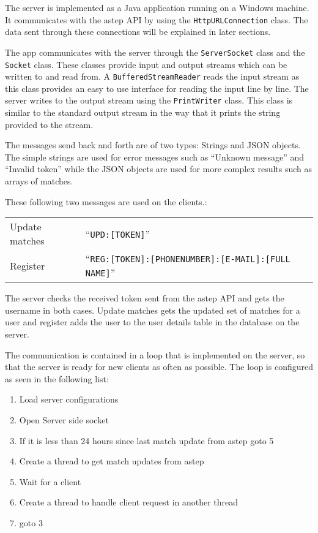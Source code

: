 The server is implemented as a Java application running on a Windows machine.
It communicates with the \gls{astep} API by using the \texttt{HttpURLConnection} class.
The data sent through these connections will be explained in later sections.

The app communicates with the server through the \texttt{ServerSocket} class and the \texttt{Socket} class.
These classes provide input and output streams which can be written to and read from.
A \texttt{BufferedStreamReader} reads the input stream as this class provides an easy to use interface for reading the input line by line.
The server writes to the output stream using the \texttt{PrintWriter} class.
This class is similar to the standard output stream in the way that it prints the string provided to the stream.

The messages send back and forth are of two types: Strings and JSON objects.
The simple strings are used for error messages such as \enquote{Unknown message} and \enquote{Invalid token} while the JSON objects are used for more complex results such as arrays of matches.

These following two messages are used on the clients.:

{\centering
	\begin{tabular}{l l}
		Update matches & \enquote{\texttt{UPD:[TOKEN]}}\\
		Register & \enquote{\texttt{REG:[TOKEN]:[PHONENUMBER]:[E-MAIL]:[FULL NAME]}}
	\end{tabular}
}

The server checks the received token sent from the \gls{astep} API and gets the username in both cases.
Update matches gets the updated set of matches for a user and register adds the user to the user details table in the database on the server.

The communication is contained in a loop that is implemented on the server, so that the server is ready for new clients as often as possible.
The loop is configured as seen in the following list:

\begin{enumerate}
	\item Load server configurations
	\item Open Server side socket
	\item If it is less than 24 hours since last match update from \gls{astep} goto 5
	\item Create a thread to get match updates from \gls{astep}
	\item Wait for a client
	\item Create a thread to handle client request in another thread
	\item goto 3
\end{enumerate}

